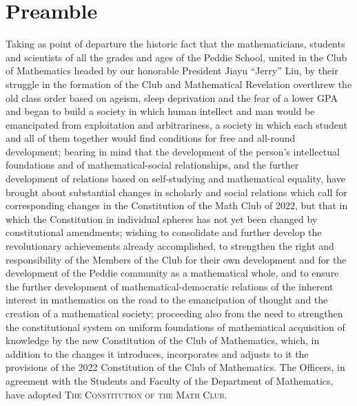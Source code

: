\documentclass[12pt, letterpaper]{article}
\begin{document}
\fontsize{12pt}{12pt}\selectfont
\setlength{\abovedisplayskip}{0pt}

%
%
%
%

\section*{Preamble}
Taking as point of departure the historic fact that the mathematicians, students and scientists of all the grades and ages of the Peddie School, united in the Club of Mathematics headed by our honorable President Jiayu “Jerry” Liu, by their struggle in the formation of the Club and Mathematical Revelation overthrew the old class order based on ageism, sleep deprivation and the fear of a lower GPA and began to build a society in which human intellect and man would be emancipated from exploitation and arbitrariness, a society in which each student and all of them together would find conditions for free and all-round development; bearing in mind that the development of the person’s intellectual foundations and of mathematical-social relationships, and the further development of relations based on self-studying and mathematical equality, have brought about substantial changes in scholarly and social relations which call for corresponding changes in the Constitution of the Math Club of 2022, but that in which the Constitution in individual spheres has not yet been changed by constitutional amendments; wishing to consolidate and further develop the revolutionary achievements already accomplished, to strengthen the right and responsibility of the Members of the Club for their own development and for the development of the Peddie community as a mathematical whole, and to ensure the further development of mathematical-democratic relations of the inherent interest in mathematics on the road to the emancipation of thought and the creation of a mathematical society; proceeding also from the need to strengthen the constitutional system on uniform foundations of mathematical acquisition of knowledge by the new Constitution of the Club of Mathematics, which, in addition to the changes it introduces, incorporates and adjusts to it the provisions of the 2022 Constitution of the Club of Mathematics. The Officers, in agreement with the Students and Faculty of the Department of Mathematics, have adopted \textsc{\large The Constitution of the Math Club}.
\end{document}
